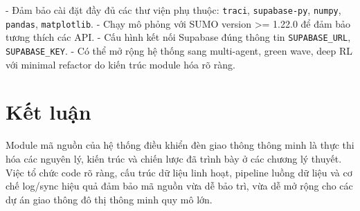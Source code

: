 - Đảm bảo cài đặt đầy đủ các thư viện phụ thuộc: \texttt{traci}, \texttt{supabase-py}, \texttt{numpy}, \texttt{pandas}, \texttt{matplotlib}.
- Chạy mô phỏng với SUMO version >= 1.22.0 để đảm bảo tương thích các API.
- Cấu hình kết nối Supabase đúng thông tin \texttt{SUPABASE\_URL}, \texttt{SUPABASE\_KEY}.
- Có thể mở rộng hệ thống sang multi-agent, green wave, deep RL với minimal refactor do kiến trúc module hóa rõ ràng.

\section{Kết luận}

Module mã nguồn của hệ thống điều khiển đèn giao thông thông minh là thực thi hóa các nguyên lý, kiến trúc và chiến lược đã trình bày ở các chương lý thuyết. Việc tổ chức code rõ ràng, cấu trúc dữ liệu linh hoạt, pipeline luồng dữ liệu và cơ chế log/sync hiệu quả đảm bảo mã nguồn vừa dễ bảo trì, vừa dễ mở rộng cho các dự án giao thông đô thị thông minh quy mô lớn.
